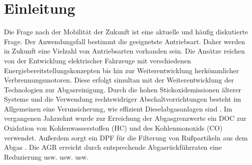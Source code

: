 \section{Einleitung}
\label{sec:einleitung}
Die Frage nach der Mobilität der Zukunft ist eine aktuelle und häufig diskutierte Frage. Der Anwendungsfall bestimmt die geeignetste Antriebsart. Daher werden in Zukunft eine Vielzahl von Antriebsarten vorhanden sein. Die Ansätze reichen von der Entwicklung elektrischer Fahrzeuge mit verschiedenen Energiebereitstellungskonzepten bis hin zur Weiterentwicklung herkömmlicher Verbrennungsmotoren. Diese erfolgt simultan mit der Weiterentwicklung der Technologien zur Abgasreinigung. Durch die hohen Stickoxidemissionen älterer Systeme und die Verwendung rechtswidriger Abschaltvorrichtungen besteht im Allgemeinen eine Verunsicherung, wie effizient Dieselabgasanlagen sind \cite{Koch2018, Reif2010}. Im vergangenen Jahrzehnt wurde zur Erreichung der Abgasgrenzwerte ein \ac{DOC} zur Oxidation von Kohlenwasserstoffen (HC) und des Kohlenmonoxids (CO) verwendet. Außerdem sorgt ein \ac{DPF} für die Filterung von Rußpartikeln aus dem Abgas \cite{Reif2012}. Die \ac{AGR} erreicht durch entsprechende Abgasrückführraten eine Reduzierung usw. usw. usw.




